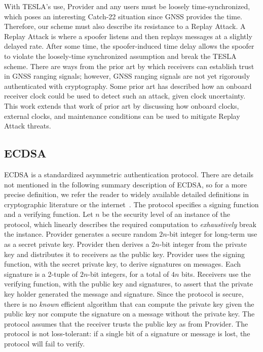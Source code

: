 \documentclass[letterpaper,times]{IONconf/IONconf}
\begin{document}
	With TESLA's use, Provider and any users must be loosely time-synchronized, which poses an interesting Catch-22 situation since GNSS provides the time.
	Therefore, our scheme must also describe its resistance to a Replay Attack.
	A Replay Attack is where a spoofer listens and then replays messages at a slightly delayed rate.
	After some time, the spoofer-induced time delay allows the spoofer to violate the loosely-time synchronized assumption and break the TESLA scheme.
	There are ways from the prior art by which receivers can establish trust in GNSS ranging signals\cite{Psiaki2016,Fernandez-Hernandez2018}; however, GNSS ranging signals are not yet rigorously authenticated with cryptography.
	Some prior art has described how an onboard receiver clock could be used to detect such an attack, given clock uncertainty\cite{time_sync_paper}.
	This work extends that work of prior art by discussing how onboard clocks, external clocks, and maintenance conditions can be used to mitigate Replay Attack threats.

	\subsection{ECDSA} \label{sub:ecdsa}

		ECDSA is a standardized asymmetric authentication protocol.
		There are details not mentioned in the following summary description of ECDSA, so for a more precise definition, we refer the reader to widely available detailed definitions in cryptographic literature or the internet~\cite{boneh2017graduate}.
		The protocol specifies a signing function and a verifying function.
		Let $n$ be the security level of an instance of the protocol, which linearly describes the required computation to {\em exhaustively} break the instance.
		Provider generates a secure random $2n$-bit integer for long-term use as a secret private key.
		Provider then derives a $2n$-bit integer from the private key and distributes it to receivers as the public key.
		Provider uses the signing function, with the secret private key, to derive signatures on messages.
		Each signature is a 2-tuple of $2n$-bit integers, for a total of $4n$ bits.
		Receivers use the verifying function, with the public key and signatures, to assert that the private key holder generated the message and signature.
		Since the protocol is secure, there is no {\em known} efficient algorithm that can compute the private key given the public key nor compute the signature on a message without the private key.
		The protocol assumes that the receiver trusts the public key as from Provider.
		The protocol is not loss-tolerant: if a single bit of a signature or message is lost, the protocol will fail to verify.
\end{document}
